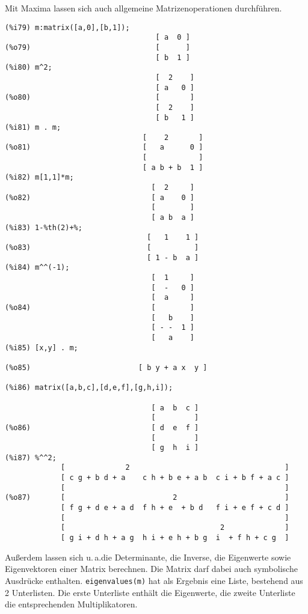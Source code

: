 \documentclass[12pt]{scrartcl}
\newcommand*\ua{u.\,a.\xspace}
\begin{document}
Mit Maxima lassen sich auch allgemeine Matrizenoperationen durchführen.

\begin{verbatim}
(%i79) m:matrix([a,0],[b,1]);
                                   [ a  0 ]
(%o79)                             [      ]
                                   [ b  1 ]
(%i80) m^2;
                                   [  2    ]
                                   [ a   0 ]
(%o80)                             [       ]
                                   [  2    ]
                                   [ b   1 ]
(%i81) m . m;
                                [    2       ]
(%o81)                          [   a      0 ]
                                [            ]
                                [ a b + b  1 ]
(%i82) m[1,1]*m;
                                  [  2     ]
(%o82)                            [ a    0 ]
                                  [        ]
                                  [ a b  a ]
(%i83) 1-%th(2)+%;
                                 [   1    1 ]
(%o83)                           [          ]
                                 [ 1 - b  a ]
(%i84) m^^(-1);
                                  [  1     ]
                                  [  -   0 ]
                                  [  a     ]
(%o84)                            [        ]
                                  [   b    ]
                                  [ - -  1 ]
                                  [   a    ]
(%i85) [x,y] . m;

(%o85)                         [ b y + a x  y ]

(%i86) matrix([a,b,c],[d,e,f],[g,h,i]);

                                  [ a  b  c ]
                                  [         ]
(%o86)                            [ d  e  f ]
                                  [         ]
                                  [ g  h  i ]
(%i87) %^^2;
             [              2                                    ]
             [ c g + b d + a    c h + b e + a b  c i + b f + a c ]
             [                                                   ]
(%o87)       [                         2                         ]
             [ f g + d e + a d  f h + e  + b d   f i + e f + c d ]
             [                                                   ]
             [                                    2              ]
             [ g i + d h + a g  h i + e h + b g  i  + f h + c g  ]
\end{verbatim}

Außerdem lassen sich \ua\@ die Determinante, die Inverse, die
Eigenwerte sowie Eigenvektoren einer Matrix berechnen. Die Matrix darf
dabei auch symbolische Ausdrücke enthalten. \texttt{eigenvalues(m)}
hat als Ergebnis eine Liste, bestehend aus 2 Unterlisten. Die erste
Unterliste enthält die Eigenwerte, die zweite Unterliste die
entsprechenden Multiplikatoren.
\end{document}
